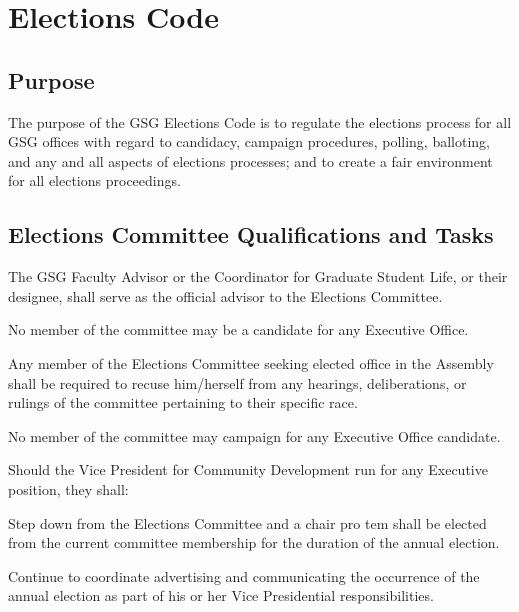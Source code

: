 \chapter{Elections Code}

\section{Purpose}

The purpose of the GSG Elections Code is to regulate the elections process for all GSG offices with regard to candidacy, campaign procedures, polling, balloting, and any and all aspects of elections processes; and to create a fair environment for all elections proceedings.

\section{Elections Committee Qualifications and Tasks}
\begin{bylaws-number}
  \item The GSG Faculty Advisor or the Coordinator for Graduate Student Life, or their designee, shall serve as the official advisor to the Elections Committee.
  \begin{bylaws-number}
    \item No member of the committee may be a candidate for any Executive Office.
    \item Any member of the Elections Committee seeking elected office in the Assembly shall be required to recuse him/herself from any hearings, deliberations, or rulings of the committee pertaining to their specific race.
    \item No member of the committee may campaign for any Executive Office candidate.
    \item Should the Vice President for Community Development run for any Executive position, they shall:
    \begin{bylaws-number}
      \item Step down from the Elections Committee and a chair pro tem shall be elected from the current committee membership for the duration of the annual election.
      \item Continue to coordinate advertising and communicating the occurrence of the annual election as part of his or her Vice Presidential responsibilities.
    \end{bylaws-number}
  \end{bylaws-number}
\end{bylaws-number}

